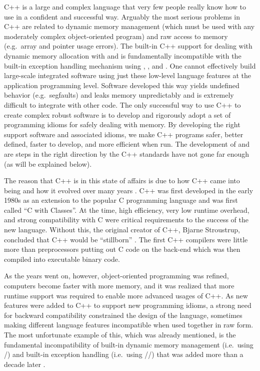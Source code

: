 \documentclass[pdf,ps2pdf,11pt]{SANDreport}
\begin{document}
C++ is a large and complex language that very few people really know
how to use in a confident and successful way.  Arguably the most
serious problems in C++ are related to dynamic memory management
(which must be used with any moderately complex object-oriented
program) and raw access to memory (e.g.\ array and pointer usage
errors).  The built-in C++ support for dealing with dynamic memory
allocation with {} and {} is fundamentally
incompatible with the built-in exception handling mechanism using
{}, {}, and {}.  One cannot effectively
build large-scale integrated software using just these low-level
language features at the application programming level.  Software
developed this way yields undefined behavior (e.g.\ segfaults) and
leaks memory unpredictably and is extremely difficult to integrate
with other code.  The only successful way to use C++ to create complex
robust software is to develop and rigorously adopt a set of
programming idioms for safely dealing with memory.  By developing the
right support software and associated idioms, we make C++ programs
safer, better defined, faster to develop, and more efficient when run.
The development of {} and {}
are steps in the right direction by the C++ standards have not gone
far enough (as will be explained below).

The reason that C++ is in this state of affairs is due to how C++ came
into being and how it evolved over many years {}\cite{stroustrup94,
stroustrup07}.  C++ was first developed in the early 1980s as an
extension to the popular C programming language and was first called
``C with Classes''.  At the time, high efficiency, very low runtime
overhead, and strong compatibility with C were critical requirements
to the success of the new language.  Without this, the original
creator of C++, Bjarne Stroustrup, concluded that C++ would be
``stillborn'' {}\cite{stroustrup97}.  The first C++ compilers were
little more than preprocessors putting out C code on the back-end
which was then compiled into executable binary code.

As the years went on, however, object-oriented programming was
refined, computers become faster with more memory, and it was realized
that more runtime support was required to enable more advanced usages
of C++.  As new features were added to C++ to support new programming
idioms, a strong need for backward compatibility constrained the
design of the language, sometimes making different language features
incompatible when used together in raw form.  The most unfortunate
example of this, which was already mentioned, is the fundamental
incompatibility of built-in dynamic memory management (i.e.\ using
{}/{}) and built-in exception handling (i.e.\
using {}/{}/{}) that was added more
than a decade later {}\cite{stroustrup94}.
\end{document}
